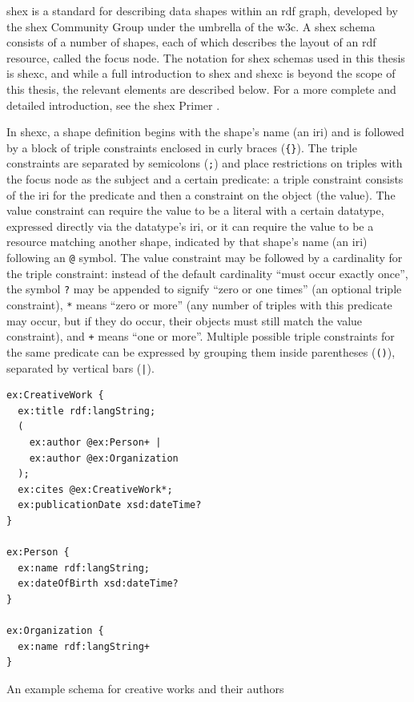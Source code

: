 \acrfull{shex} \cite{shex}
is a standard for describing data shapes within an \gls{rdf} graph,
developed by the \gls{shex} Community Group under the umbrella of the \gls{w3c}.
A \gls{shex} \gls{schema} consists of a number of \glspl{shape},
each of which describes the layout of an \gls{rdf} \gls{resource},
called the \gls{focus node}.
The notation for \gls{shex} \glspl{schema} used in this thesis is \gls{shexc},
and while a full introduction to \gls{shex} and \gls{shexc} is beyond the scope of this thesis,
the relevant elements are described below.
For a more complete and detailed introduction,
see the \gls{shex} Primer \cite{shex-primer}.

In \gls{shexc}, a \gls{shape} definition begins with the \gls{shape}’s name (an \gls{iri})
and is followed by a block of \glspl{triple constraint} enclosed in curly braces (\lstinline!{}!).
The \glspl{triple constraint} are separated by semicolons (\lstinline{;})
and place restrictions on \glspl{triple} with the \gls{focus node} as the \gls{subject} and a certain \gls{predicate}:
a \gls{triple constraint} consists of the \gls{iri} for the \gls{predicate} and then a constraint on the \gls{object} (the value).
The value constraint can require the value to be a literal with a certain datatype,
expressed directly via the datatype’s \gls{iri},
or it can require the value to be a \gls{resource} matching another \gls{shape},
indicated by that \gls{shape}’s name (an \gls{iri}) following an \lstinline{@} symbol.
The value constraint may be followed by a cardinality for the \gls{triple constraint}:
instead of the default cardinality “must occur exactly once”,
the symbol \lstinline{?} may be appended to signify “zero or one times”
(an optional \gls{triple constraint}),
\lstinline{*} means “zero or more”
(any number of \glspl{triple} with this \gls{predicate} may occur,
but if they do occur, their \glspl{object} must still match the \gls{value constraint}),
and \lstinline{+} means “one or more”.
Multiple possible \glspl{triple constraint} for the same \gls{predicate} can be expressed
by grouping them inside parentheses (\lstinline{()}), separated by vertical bars (\lstinline{|}).

\begin{lstfloat}
\begin{lstlisting}[language=sparql]
ex:CreativeWork {
  ex:title rdf:langString;
  (
    ex:author @ex:Person+ |
    ex:author @ex:Organization
  );
  ex:cites @ex:CreativeWork*;
  ex:publicationDate xsd:dateTime?
}

ex:Person {
  ex:name rdf:langString;
  ex:dateOfBirth xsd:dateTime?
}

ex:Organization {
  ex:name rdf:langString+
}
\end{lstlisting}
\caption{An example \gls{schema} for creative works and their authors}
\label{listing:shex-example}
\end{lstfloat}

